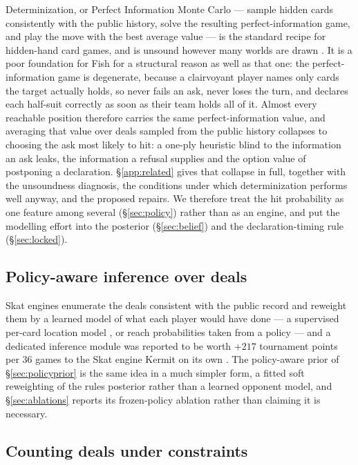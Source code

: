 \documentclass[11pt]{article}
\theoremstyle{definition}
\begin{document}
Determinization, or Perfect Information Monte Carlo --- sample hidden cards
consistently with the public history, solve the resulting perfect-information
game, and play the move with the best average value \cite{ginsberg-gib} --- is
the standard recipe for hidden-hand card games, and is unsound however many
worlds are drawn \cite{frank-basin-ai}. It is a poor foundation for Fish for a
structural reason as well as that one: the perfect-information game is
degenerate, because a clairvoyant player names only cards the target actually
holds, so never fails an ask, never loses the turn, and declares each half-suit
correctly as soon as their team holds all of it. Almost every reachable position
therefore carries the same perfect-information value, and averaging that value
over deals sampled from the public history collapses to choosing the ask most
likely to hit: a one-ply heuristic blind to the information an ask leaks, the
information a refusal supplies and the option value of postponing a declaration.
\S\ref{app:related} gives that collapse in full, together with the unsoundness
diagnosis, the conditions under which determinization performs well anyway, and
the proposed repairs. We therefore treat the hit probability as one feature among
several (\S\ref{sec:policy}) rather than as an engine, and put the modelling
effort into the posterior (\S\ref{sec:belief}) and the declaration-timing rule
(\S\ref{sec:locked}).

\subsection{Policy-aware inference over deals}

Skat engines enumerate the deals consistent with the public record and
reweight them by a learned model of what each player would have done --- a
supervised per-card location model \cite{solinas-supervised}, or reach
probabilities taken from a policy \cite{rebstock-inference} --- and a
dedicated inference module was reported to be worth $+217$ tournament points
per 36 games to the Skat engine Kermit on its own \cite{buro-kermit}. The
policy-aware prior of \S\ref{sec:policyprior} is the same idea in a much
simpler form, a fitted soft reweighting of the rules posterior rather than a
learned opponent model, and \S\ref{sec:ablations} reports its frozen-policy
ablation rather than claiming it is necessary.

\subsection{Counting deals under constraints}
\end{document}
